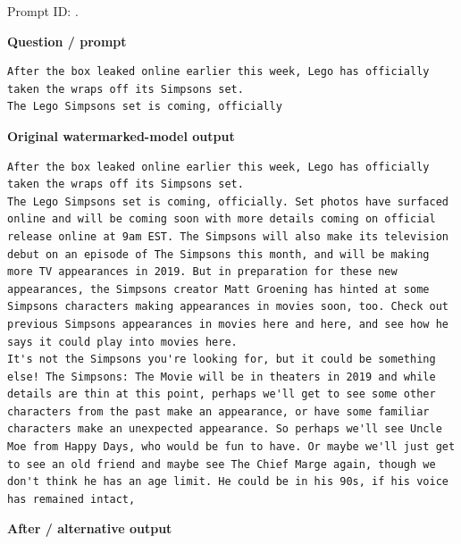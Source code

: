 Prompt ID:
\texttt{}.

\textbf{Question / prompt}

\begin{Verbatim}
After the box leaked online earlier this week, Lego has officially taken the wraps off its Simpsons set.
The Lego Simpsons set is coming, officially
\end{Verbatim}

\textbf{Original watermarked-model output}

\begin{Verbatim}
After the box leaked online earlier this week, Lego has officially taken the wraps off its Simpsons set.
The Lego Simpsons set is coming, officially. Set photos have surfaced online and will be coming soon with more details coming on official release online at 9am EST. The Simpsons will also make its television debut on an episode of The Simpsons this month, and will be making more TV appearances in 2019. But in preparation for these new appearances, the Simpsons creator Matt Groening has hinted at some Simpsons characters making appearances in movies soon, too. Check out previous Simpsons appearances in movies here and here, and see how he says it could play into movies here.
It's not the Simpsons you're looking for, but it could be something else! The Simpsons: The Movie will be in theaters in 2019 and while details are thin at this point, perhaps we'll get to see some other characters from the past make an appearance, or have some familiar characters make an unexpected appearance. So perhaps we'll see Uncle Moe from Happy Days, who would be fun to have. Or maybe we'll just get to see an old friend and maybe see The Chief Marge again, though we don't think he has an age limit. He could be in his 90s, if his voice has remained intact,
\end{Verbatim}

\textbf{After / alternative output}

